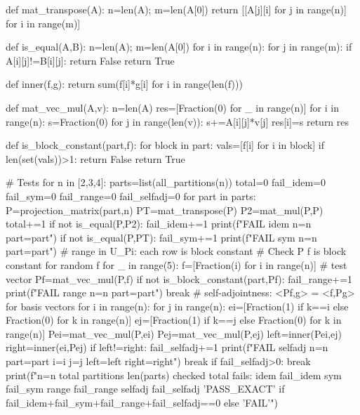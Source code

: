 def mat_transpose(A):
    n=len(A); m=len(A[0])
    return [[A[j][i] for j in range(n)] for i in range(m)]

def is_equal(A,B):
    n=len(A); m=len(A[0])
    for i in range(n):
        for j in range(m):
            if A[i][j]!=B[i][j]:
                return False
    return True

def inner(f,g):
    return sum(f[i]*g[i] for i in range(len(f)))

def mat_vec_mul(A,v):
    n=len(A)
    res=[Fraction(0) for _ in range(n)]
    for i in range(n):
        s=Fraction(0)
        for j in range(len(v)):
            s+=A[i][j]*v[j]
        res[i]=s
    return res

def is_block_constant(part,f):
    for block in part:
        vals=[f[i] for i in block]
        if len(set(vals))>1:
            return False
    return True

# Tests
for n in [2,3,4]:
    parts=list(all_partitions(n))
    total=0
    fail_idem=0
    fail_sym=0
    fail_range=0
    fail_selfadj=0
    for part in parts:
        P=projection_matrix(part,n)
        PT=mat_transpose(P)
        P2=mat_mul(P,P)
        total+=1
        if not is_equal(P,P2):
            fail_idem+=1
            print(f"FAIL idem n={n} part={part}")
        if not is_equal(P,PT):
            fail_sym+=1
            print(f"FAIL sym n={n} part={part}")
        # range in U_Pi: each row is block constant
        # Check P f is block constant for random f
        for _ in range(5):
            f=[Fraction(i) for i in range(n)] # test vector
            Pf=mat_vec_mul(P,f)
            if not is_block_constant(part,Pf):
                fail_range+=1
                print(f"FAIL range n={n} part={part}")
                break
        # self-adjointness: <Pf,g> = <f,Pg> for basis vectors
        for i in range(n):
            for j in range(n):
                ei=[Fraction(1) if k==i else Fraction(0) for k in range(n)]
                ej=[Fraction(1) if k==j else Fraction(0) for k in range(n)]
                Pei=mat_vec_mul(P,ei)
                Pej=mat_vec_mul(P,ej)
                left=inner(Pei,ej)
                right=inner(ei,Pej)
                if left!=right:
                    fail_selfadj+=1
                    print(f"FAIL selfadj n={n} part={part} i={i} j={j} left={left} right={right}")
                    break
            if fail_selfadj>0:
                break
    print(f"n={n} total partitions {len(parts)} checked {total} fails: idem {fail_idem} sym {fail_sym} range {fail_range} selfadj {fail_selfadj} {'PASS_EXACT' if fail_idem+fail_sym+fail_range+fail_selfadj==0 else 'FAIL'}")


